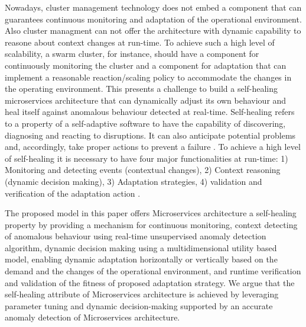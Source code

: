 \documentclass{ieeeaccess}
\begin{document}
Nowadays, cluster management technology does not embed a component that can guarantees continuous monitoring and adaptation of the operational environment. Also cluster managment can not offer the architecture with dynamic capability to reasone  about context changes at run-time. To achieve such a high level of scalability, a swarm cluster, for instance, should have a component for continuously monitoring the cluster and a component for adaptation that can implement a reasonable reaction/scaling policy to accommodate the changes in the operating environment. This presents a challenge to build a self-healing microservices architecture that can dynamically adjust its own behaviour and heal itself against anomalous behaviour detected at real-time. Self-healing refers to a property of a self-adaptive software to have the capability of discovering, diagnosing and reacting to disruptions. It can also anticipate potential problems and, accordingly, take proper actions to prevent a failure \cite{Salehie:2009p3693}. To achieve a high level of  self-healing it is necessary to have four major functionalities at run-time: 1) Monitoring and detecting events (contextual changes), 2) Context reasoning (dynamic decision making), 3) Adaptation strategies, 4) validation and verification of the adaptation action \cite{Kapitsaki:2009p3694}.  


The proposed model in this paper offers Microservices architecture a self-healing property by providing a mechanism for continuous monitoring, context detecting of anomalous behaviour using real-time unsupervised anomaly detection algorithm, dynamic decision making using a multidimensional utility based model, enabling dynamic adaptation horizontally or vertically based on the demand and the changes of the operational environment, and runtime verification and validation of the fitness of proposed adaptation strategy. We argue that the self-healing attribute of Microservices architecture is achieved by leveraging parameter tuning and dynamic decision-making supported by an accurate anomaly detection of Microservices architecture. 
\end{document}
